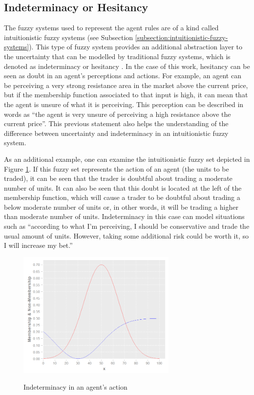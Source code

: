\subsection{Indeterminacy or Hesitancy}
\label{subsection:indeterminacy-or-hesitancy}

The fuzzy systems used to represent the agent rules are of a kind called
intuitionistic fuzzy systems (see Subsection
\ref{subsection:intuitionistic-fuzzy-systems}). This type of fuzzy system
provides an additional abstraction layer to the uncertainty that can be modelled
by traditional fuzzy systems, which is denoted as indeterminacy or hesitancy
\cite{Atanassov1986}. In the case of this work, hesitancy can be seen as doubt
in an agent's perceptions and actions. For example, an agent can be perceiving a
very strong resistance area in the market above the current price, but if the
membership function associated to that input is high, it can mean that the agent
is unsure of what it is perceiving. This perception can be described in words as
``the agent is very unsure of perceiving a high resistance above the current
price''. This previous statement also helps the understanding of the difference
between uncertainty and indeterminacy in an intuitionistic fuzzy system.

As an additional example, one can examine the intuitionistic fuzzy set depicted
in Figure \ref{figure:indeterminacy-in-an-agents-action}. If this fuzzy set
represents the action of an agent (the units to be traded), it can be seen that
the trader is doubtful about trading a moderate number of units. It can also be
seen that this doubt is located at the left of the membership function, which
will cause a trader to be doubtful about trading a below moderate number of
units or, in other words, it will be trading a higher than moderate number of
units. Indeterminacy in this case can model situations such as ``according to
what I'm perceiving, I should be conservative and trade the usual amount of
units. However, taking some additional risk could be worth it, so I will
increase my bet.''

\begin{figure}
\caption{Indeterminacy in an agent's action} \centering
\includegraphics[width=0.7\textwidth]{img/example-of-ifs.png}
\label{figure:indeterminacy-in-an-agents-action}
\end{figure}

